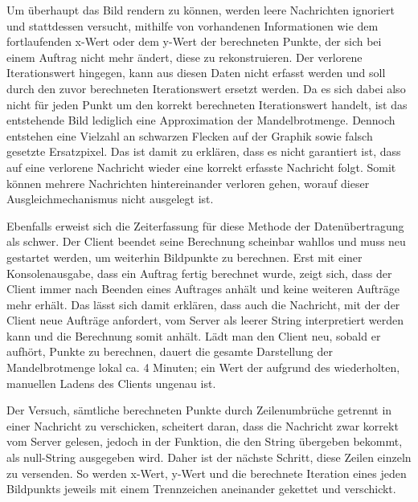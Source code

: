\documentclass[12pt, onecolumn, notitlepage]{scrartcl}
\begin{document}
Um überhaupt das Bild rendern zu können, werden leere Nachrichten ignoriert und stattdessen versucht, mithilfe von vorhandenen Informationen wie dem fortlaufenden x-Wert oder dem y-Wert der berechneten Punkte, der sich bei einem Auftrag nicht mehr ändert, diese zu rekonstruieren. Der verlorene Iterationswert hingegen, kann aus diesen Daten nicht erfasst werden und soll durch den zuvor berechneten Iterationswert ersetzt werden. Da es sich dabei also nicht für jeden Punkt um den korrekt berechneten Iterationswert handelt, ist das entstehende Bild lediglich eine Approximation der Mandelbrotmenge. Dennoch entstehen eine Vielzahl an schwarzen Flecken auf der Graphik sowie falsch gesetzte Ersatzpixel. Das ist damit zu erklären, dass es nicht garantiert ist, dass auf eine verlorene Nachricht wieder eine korrekt erfasste Nachricht folgt. Somit können mehrere Nachrichten hintereinander verloren gehen, worauf dieser Ausgleichmechanismus nicht ausgelegt ist. \par

Ebenfalls erweist sich die Zeiterfassung für diese Methode der Datenübertragung als schwer. Der Client beendet seine Berechnung scheinbar wahllos und muss neu gestartet werden, um weiterhin Bildpunkte zu berechnen. Erst mit einer Konsolenausgabe, dass ein Auftrag fertig berechnet wurde, zeigt sich, dass der Client immer nach Beenden eines Auftrages anhält und keine weiteren Aufträge mehr erhält. Das lässt sich damit erklären, dass auch die Nachricht, mit der der Client neue Aufträge anfordert, vom Server als leerer String interpretiert werden kann und die Berechnung somit anhält. Lädt man den Client neu, sobald er aufhört, Punkte zu berechnen, dauert die gesamte Darstellung der Mandelbrotmenge lokal ca. 4 Minuten; ein Wert der aufgrund des wiederholten, manuellen Ladens des Clients ungenau ist.\par

Der Versuch, sämtliche berechneten Punkte durch Zeilenumbrüche getrennt in einer Nachricht zu verschicken, scheitert daran, dass die Nachricht zwar korrekt vom Server gelesen, jedoch in der Funktion, die den String übergeben bekommt, als null-String ausgegeben wird. Daher ist der nächste Schritt, diese Zeilen einzeln zu versenden. So werden x-Wert, y-Wert und die berechnete Iteration eines jeden Bildpunkts jeweils mit einem Trennzeichen aneinander gekettet und verschickt. 
\end{document}
